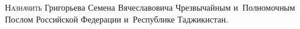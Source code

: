 \documentclass{../president-decree}
\begin{document}

\lettrine{Н}{азначить} Григорьева Семена Вячеславовича Чрезвычайным и~Полномочным Послом Российской Федерации и~Республике Таджикистан.

\end{document}
